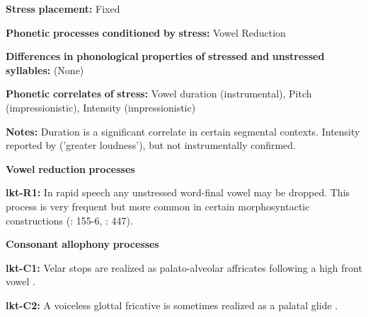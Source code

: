 \begin{styleBody}
\textbf{Stress} \textbf{placement:} Fixed
\end{styleBody}

\begin{styleBody}
\textbf{Phonetic} \textbf{processes} \textbf{conditioned} \textbf{by} \textbf{stress:} Vowel Reduction
\end{styleBody}

\begin{styleBody}
\textbf{Differences} \textbf{in} \textbf{phonological} \textbf{properties} \textbf{of} \textbf{stressed} \textbf{and} \textbf{unstressed} \textbf{syllables:} (None)
\end{styleBody}

\begin{styleBody}
\textbf{Phonetic} \textbf{correlates} \textbf{of} \textbf{stress:} Vowel duration (instrumental), Pitch (impressionistic), Intensity (impressionistic)
\end{styleBody}

\begin{styleBody}
\textbf{Notes:} Duration is a significant correlate in certain segmental contexts. Intensity reported by \citet{UllrichEtAl2008} (’greater loudness’), but not instrumentally confirmed.
\end{styleBody}

\begin{styleBody}
\textbf{Vowel} \textbf{reduction} \textbf{processes}
\end{styleBody}

\begin{styleBody}
\textbf{lkt-R1:} In rapid speech any unstressed word-final vowel may be dropped. This process is very frequent but more common in certain morphosyntactic constructions (\citealt{Mirzayan2010}: 155-6, \citealt{TaylorRood1996}: 447).
\end{styleBody}

\begin{styleBody}
\textbf{Consonant} \textbf{allophony} \textbf{processes}
\end{styleBody}

\begin{styleBody}
\textbf{lkt-C1:} Velar stops are realized as palato-alveolar affricates following a high front vowel \citep[6]{Ingham2005}.
\end{styleBody}

\begin{styleBody}
\textbf{lkt-C2:} A voiceless glottal fricative is sometimes realized as a palatal glide \citep{Ingham2005}.
\end{styleBody}

